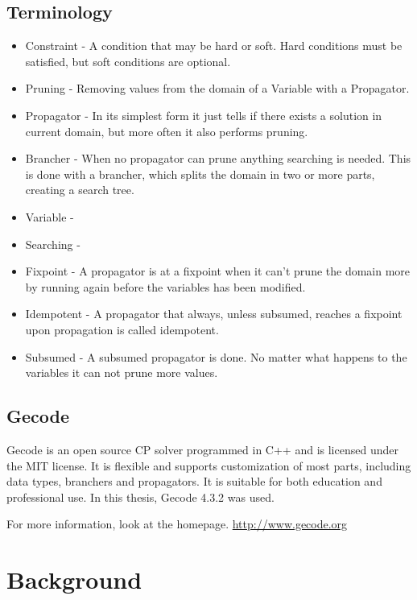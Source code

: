 \documentclass[a4paper,11pt]{article}
\begin{document}
\subsection{Terminology}
\begin{itemize}
\item{Constraint - A condition that may be hard or soft. Hard conditions must be satisfied, but soft conditions are optional.}
\item{Pruning} - Removing values from the domain of a Variable with a Propagator.
\item{Propagator} - In its simplest form it just tells if there exists a solution in current domain, but more often it also performs pruning.
\item{Brancher} - When no propagator can prune anything searching is needed. This is done with a brancher, which splits the domain in two or more parts, creating a search tree.
\item{Variable} -
\item{Searching} - 
\item{Fixpoint} - A propagator is at a fixpoint when it can't prune the domain more by running again before the variables has been modified.
\item{Idempotent} - A propagator that always, unless subsumed, reaches a fixpoint upon propagation is called idempotent.
\item{Subsumed} - A subsumed propagator is done. No matter what happens to the variables it can not prune more values.
\end{itemize}

\subsection{Gecode}
Gecode is an open source CP solver programmed in C++ and is licensed under the MIT license. It is flexible and supports customization of most parts, including data types, branchers and propagators. It is suitable for both education and professional use. In this thesis, Gecode 4.3.2 was used.

For more information, look at the homepage. \url{http://www.gecode.org}

\section{Background}
\end{document}
